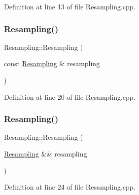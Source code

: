 Definition at line 13 of file Resampling.\+cpp.

\mbox{\label{classbfl_1_1Resampling_ab8b3061b26141dc7630fa2481e63c27b}} 
\subsubsection{\texorpdfstring{Resampling()}{Resampling()}\hspace{0.1cm}{\footnotesize\ttfamily [3/4]}}
{\footnotesize\ttfamily Resampling\+::\+Resampling (\begin{DoxyParamCaption}\item[{const \mbox{\hyperlink{classbfl_1_1Resampling}{Resampling}} \&}]{resampling }\end{DoxyParamCaption})\hspace{0.3cm}{\ttfamily [noexcept]}}



Definition at line 20 of file Resampling.\+cpp.

\mbox{\label{classbfl_1_1Resampling_af49062fae532a36662703905ad1cffca}} 
\subsubsection{\texorpdfstring{Resampling()}{Resampling()}\hspace{0.1cm}{\footnotesize\ttfamily [4/4]}}
{\footnotesize\ttfamily Resampling\+::\+Resampling (\begin{DoxyParamCaption}\item[{\mbox{\hyperlink{classbfl_1_1Resampling}{Resampling}} \&\&}]{resampling }\end{DoxyParamCaption})\hspace{0.3cm}{\ttfamily [noexcept]}}



Definition at line 24 of file Resampling.\+cpp.

\mbox{\label{classbfl_1_1Resampling_a2a11fe3c1ae79137d6bf4bc6a5171083}} 
